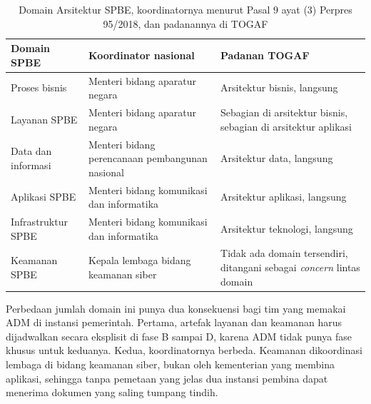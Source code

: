 \begin{table}[!htb]
  \centering
  \caption{Domain Arsitektur SPBE, koordinatornya menurut Pasal 9 ayat (3)
           Perpres 95/2018, dan padanannya di TOGAF}
  \label{tab:ch02-domain-spbe}
  {\footnotesize
  \begin{tabularx}{\textwidth}{>{\raggedright\arraybackslash}p{2.6cm}
                               >{\raggedright\arraybackslash}X
                               >{\raggedright\arraybackslash}X}
    \hline
    \textbf{Domain SPBE} & \textbf{Koordinator nasional} & \textbf{Padanan TOGAF} \\
    \hline
    Proses bisnis & Menteri bidang aparatur negara & Arsitektur bisnis, langsung \\
    \hline
    Layanan SPBE & Menteri bidang aparatur negara & Sebagian di arsitektur bisnis, sebagian di arsitektur aplikasi \\
    \hline
    Data dan informasi & Menteri bidang perencanaan pembangunan nasional & Arsitektur data, langsung \\
    \hline
    Aplikasi SPBE & Menteri bidang komunikasi dan informatika & Arsitektur aplikasi, langsung \\
    \hline
    Infrastruktur SPBE & Menteri bidang komunikasi dan informatika & Arsitektur teknologi, langsung \\
    \hline
    Keamanan SPBE & Kepala lembaga bidang keamanan siber & Tidak ada domain tersendiri, ditangani sebagai \textit{concern} lintas domain \\
    \hline
  \end{tabularx}}
\end{table}

Perbedaan jumlah domain ini punya dua konsekuensi bagi tim yang memakai ADM
di instansi pemerintah. Pertama, artefak layanan dan keamanan harus
dijadwalkan secara eksplisit di fase B sampai D, karena ADM tidak punya fase
khusus untuk keduanya. Kedua, koordinatornya berbeda. Keamanan dikoordinasi
lembaga di bidang keamanan siber, bukan oleh kementerian yang membina
aplikasi, sehingga tanpa pemetaan yang jelas dua instansi pembina dapat
menerima dokumen yang saling tumpang tindih.

